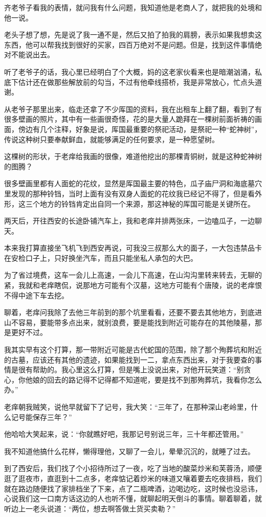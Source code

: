 齐老爷子看我的表情，就问我有什么问题，我知道他是老商人了，就把我的处境和他一说。

老头子想了想，先是说了我一通不是，然后又拍了拍我的肩膀，表示如果我想卖这东西，他可以帮我找到很好的买家，四百万绝对不是问题。但是，找到这件事情绝对不能说出去。

听了老爷子的话，我心里已经明白了个大概，妈的这老家伙看来也是暗潮汹涌，私底下估计还在做那些解放前的勾当，不过有他牵线搭桥，我是非常放心，忙点头道谢。

从老爷子那里出来，临走还拿了不少厍国的资料，我在出租车上翻了翻，看到了有很多壁画的照片，其中有一些画很奇怪，花的是大量人跪拜在一棵树前面祈祷的画面，傍边有几个注释，好象是说，厍国最重要的祭祀活动，是祭祀一种“蛇神树”，传说这种树只要奉献鲜血，就能够满足的任何要求，是一种愿望树。

这棵树的形状，于老痒给我画的很像，难道他挖出的那棵青铜树，就是这种蛇神树的图腾？

很多壁画里都有人面蛇的花纹，显然是厍国最主要的特色，瓜子庙尸洞和海底墓穴里发现的那种铃铛，当时上面有没有双身人面蛇的花纹我已经记不得了，但是看外形，这三个地方的铃铛肯定出自同一个来源，那这神秘的厍国可能是关键所在。

两天后，开往西安的长途卧铺汽车上，我和老痒并排两张床，一边嗑瓜子，一边聊天。

本来我打算直接坐飞机飞到西安再说，可我没三叔那么大的面子，一大包违禁品卡在安检口子上，只好换坐汽车，而且只能坐私人承包的大巴。

为了省过境费，这车一会儿上高速，一会儿下高速，在山沟沟里转来转去，无聊的紧，我就和老痒瞎侃，说那地方可能有个汉墓，这地方可能有个唐陵，说的老痒恨不得中途下车去挖。

聊着，老痒问我除了去他三年前到的那个坑里看看，还要不要去其他地方，到底进山不容易，要能带多点出来，就别浪费，要是能找到附近可能存在的其他陵墓，那是更好不过。

我其实早有这个打算，那一带附近可能是古代蛇国的范围，除了那个殉葬坑和附近的古墓，应该还有其他的遗迹，如果能找到一二，拿点东西出来，对于我要查的事情是很有帮助的。我心里这么打算，但是嘴上没说出来，对他开玩笑道：“别贪心，你他娘的回去的路记得不记得都不知道呢，要是找不到那殉葬坑，我看你怎么办。”

老痒朝我贼笑，说他早就留下了记号，我大笑：“三年了，在那种深山老岭里，什么记号能保存三年？”

他哈哈大笑起来，说：“你就瞧好吧，我那记号别说三年，三十年都还管用。”

我不知道他搞什么花样，懒得理他，又聊了一会儿，晕晕沉沉的，就睡了过去。

到了西安后，我们找了个小招待所过了一夜，吃了当地的酸菜炒米和芙蓉汤，顺便逛了逛夜市，直逛到十二点多，老痒惦记着炒米的味道又嚷着要去吃夜排档，我们就在路边随便找了家排档坐了下来，点了二瓶啤酒，边喝边吃，这时候也没忌讳，心说我们这一口南方话这边的人也听不懂，就聊起明天倒斗的事情。聊着聊着，就听边上一老头说道：“两位，想去啊答做土货买卖勒？”

